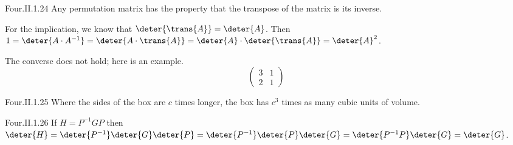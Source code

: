 \begin{ans}{Four.II.1.24}
      Any permutation matrix has the property that the transpose of the
      matrix is its inverse.

      For the implication, we know that \( \deter{\trans{A}}=\deter{A} \).
      Then \( 1=\deter{A\cdot A^{-1}}=\deter{A\cdot\trans{A}}
               =\deter{A}\cdot\deter{\trans{A}}=\deter{A}^2 \).

      The converse does not hold; here is an example.
      \begin{equation*}
        \begin{pmatrix}
          3  &1  \\
          2  &1
        \end{pmatrix}
      \end{equation*}
    
\end{ans}
\begin{ans}{Four.II.1.25}
      Where the sides of the box are \( c \) times longer, the box
      has \( c^3 \) times as many cubic units of volume.
    
\end{ans}
\begin{ans}{Four.II.1.26}
      If \( H=P^{-1}GP \)
      then \( \deter{H}=\deter{P^{-1}}\deter{G}\deter{P}
        =\deter{P^{-1}}\deter{P}\deter{G}=\deter{P^{-1}P}\deter{G}
        =\deter{G} \).
    
\end{ans}

